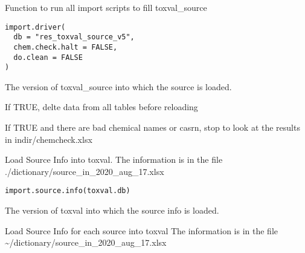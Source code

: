 \documentclass[letterpaper]{book}
\begin{document}
%
\begin{Description}\relax
Function to run all import scripts to fill toxval\_source
\end{Description}
%
\begin{Usage}
\begin{verbatim}
import.driver(
  db = "res_toxval_source_v5",
  chem.check.halt = FALSE,
  do.clean = FALSE
)
\end{verbatim}
\end{Usage}
%
\begin{Arguments}
\begin{ldescription}
\item[\code{db}] The version of toxval\_source into which the source is loaded.

\item[\code{do.clean}] If TRUE, delte data from all tables before reloading

\item[\code{chem.chek.halt}] If TRUE and there are bad chemical names or casrn,
stop to look at the results in indir/chemcheck.xlsx
\end{ldescription}
\end{Arguments}
%
\begin{Description}\relax
Load Source Info into toxval. 
The information is in the file ./dictionary/source\_in\_2020\_aug\_17.xlsx
\end{Description}
%
\begin{Usage}
\begin{verbatim}
import.source.info(toxval.db)
\end{verbatim}
\end{Usage}
%
\begin{Arguments}
\begin{ldescription}
\item[\code{toxval.db}] The version of toxval into which the source info is loaded.
\end{ldescription}
\end{Arguments}
%
\begin{Description}\relax
Load Source Info for each source into toxval
The information is in the file \textasciitilde{}/dictionary/source\_in\_2020\_aug\_17.xlsx
\end{Description}
\end{document}

